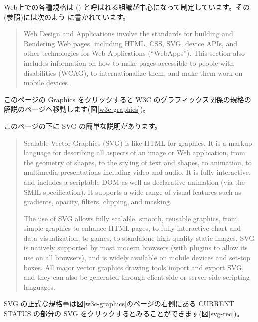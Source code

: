 Web上での各種規格は ()
と呼ばれる組織が中心になって制定しています。その
(参照)には次のよう
に書かれています。
\begin{quotation}
Web Design and Applications involve the standards for building and
 Rendering Web pages, including HTML, CSS, SVG, device APIs, and other
 technologies for Web Applications (“WebApps”). This section also
 includes information on how to make pages accessible to people with
 disabilities (WCAG), to internationalize them, and make them work on
 mobile devices.
\end{quotation}

このページの Graphics をクリックすると W3C のグラフィックス関係の規格の
解説のページへ移動します(図\ref{w3c-graphics})。

このページの下に SVG の簡単な説明があります。
\begin{quotation}
Scalable Vector Graphics (SVG) is like HTML for graphics. It is a markup
 language for describing all aspects of an image or Web application,
 from the geometry of shapes, to the styling of text and shapes, to
 animation, to multimedia presentations including video and audio. It is
 fully interactive, and includes a scriptable DOM as well as declarative
 animation (via the SMIL specification). It supports a wide range of
 visual features such as gradients, opacity, filters, clipping, and
 masking.
 
The use of SVG allows fully scalable, smooth, reusable graphics, from
 simple graphics to enhance HTML pages, to fully interactive chart and
 data visualization, to games, to standalone high-quality static
 images. SVG is natively supported by most modern browsers (with plugins
 to allow its use on all browsers), and is widely available on mobile
 devices and set-top boxes. All major vector graphics drawing tools
 import and export SVG, and they can also be generated through
 client-side or server-side scripting languages.
\end{quotation}

SVG の正式な規格書は図\ref{w3c-graphics}のページの右側にある CURRENT
STATUS の部分の SVG をクリックするとみることができます(図\ref{svg-rec})。

